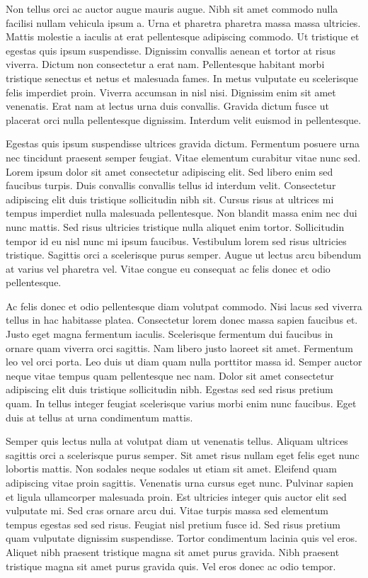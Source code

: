 \documentclass[11pt,a4paper]{article}
\begin{document}
Non tellus orci ac auctor augue mauris augue. Nibh sit amet commodo nulla facilisi nullam vehicula ipsum a. Urna et pharetra pharetra massa massa ultricies. Mattis molestie a iaculis at erat pellentesque adipiscing commodo. Ut tristique et egestas quis ipsum suspendisse. Dignissim convallis aenean et tortor at risus viverra. Dictum non consectetur a erat nam. Pellentesque habitant morbi tristique senectus et netus et malesuada fames. In metus vulputate eu scelerisque felis imperdiet proin. Viverra accumsan in nisl nisi. Dignissim enim sit amet venenatis. Erat nam at lectus urna duis convallis. Gravida dictum fusce ut placerat orci nulla pellentesque dignissim. Interdum velit euismod in pellentesque.

Egestas quis ipsum suspendisse ultrices gravida dictum. Fermentum posuere urna nec tincidunt praesent semper feugiat. Vitae elementum curabitur vitae nunc sed. Lorem ipsum dolor sit amet consectetur adipiscing elit. Sed libero enim sed faucibus turpis. Duis convallis convallis tellus id interdum velit. Consectetur adipiscing elit duis tristique sollicitudin nibh sit. Cursus risus at ultrices mi tempus imperdiet nulla malesuada pellentesque. Non blandit massa enim nec dui nunc mattis. Sed risus ultricies tristique nulla aliquet enim tortor. Sollicitudin tempor id eu nisl nunc mi ipsum faucibus. Vestibulum lorem sed risus ultricies tristique. Sagittis orci a scelerisque purus semper. Augue ut lectus arcu bibendum at varius vel pharetra vel. Vitae congue eu consequat ac felis donec et odio pellentesque.

Ac felis donec et odio pellentesque diam volutpat commodo. Nisi lacus sed viverra tellus in hac habitasse platea. Consectetur lorem donec massa sapien faucibus et. Justo eget magna fermentum iaculis. Scelerisque fermentum dui faucibus in ornare quam viverra orci sagittis. Nam libero justo laoreet sit amet. Fermentum leo vel orci porta. Leo duis ut diam quam nulla porttitor massa id. Semper auctor neque vitae tempus quam pellentesque nec nam. Dolor sit amet consectetur adipiscing elit duis tristique sollicitudin nibh. Egestas sed sed risus pretium quam. In tellus integer feugiat scelerisque varius morbi enim nunc faucibus. Eget duis at tellus at urna condimentum mattis.

Semper quis lectus nulla at volutpat diam ut venenatis tellus. Aliquam ultrices sagittis orci a scelerisque purus semper. Sit amet risus nullam eget felis eget nunc lobortis mattis. Non sodales neque sodales ut etiam sit amet. Eleifend quam adipiscing vitae proin sagittis. Venenatis urna cursus eget nunc. Pulvinar sapien et ligula ullamcorper malesuada proin. Est ultricies integer quis auctor elit sed vulputate mi. Sed cras ornare arcu dui. Vitae turpis massa sed elementum tempus egestas sed sed risus. Feugiat nisl pretium fusce id. Sed risus pretium quam vulputate dignissim suspendisse. Tortor condimentum lacinia quis vel eros. Aliquet nibh praesent tristique magna sit amet purus gravida. Nibh praesent tristique magna sit amet purus gravida quis. Vel eros donec ac odio tempor.
\end{document}
